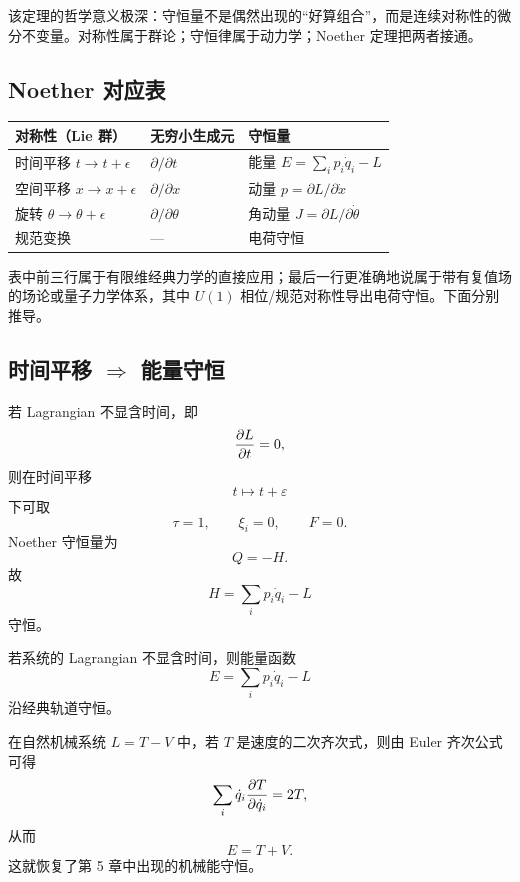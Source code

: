 \begin{remark}
该定理的哲学意义极深：守恒量不是偶然出现的“好算组合”，而是连续对称性的微分不变量。对称性属于群论；守恒律属于动力学；Noether 定理把两者接通。
\end{remark}

\subsection{Noether 对应表}

\begin{center}
\renewcommand{\arraystretch}{1.35}
\begin{tabularx}{0.94\textwidth}{>{\raggedright\arraybackslash}p{} >{\centering\arraybackslash}p{} >{\raggedright\arraybackslash}X}
\toprule
对称性（Lie 群） & 无穷小生成元 & 守恒量 \\
\midrule
时间平移 $t\to t+\epsilon$ & $\partial/\partial t$ & 能量 $E=\sum_i p_i\dot q_i-L$ \\
空间平移 $x\to x+\epsilon$ & $\partial/\partial x$ & 动量 $p=\partial L/\partial \dot x$ \\
旋转 $\theta\to \theta+\epsilon$ & $\partial/\partial \theta$ & 角动量 $J=\partial L/\partial \dot\theta$ \\
规范变换 & --- & 电荷守恒 \\
\bottomrule
\end{tabularx}
\end{center}

表中前三行属于有限维经典力学的直接应用；最后一行更准确地说属于带有复值场的场论或量子力学体系，其中 $U(1)$ 相位/规范对称性导出电荷守恒。下面分别推导。

\subsection{时间平移 $\Rightarrow$ 能量守恒}

若 Lagrangian 不显含时间，即
\[
  \pdv{L}{t}=0,
\]
则在时间平移
\[
  t\mapsto t+\varepsilon
\]
下可取
\[
  \tau=1,
  \qquad
  \xi_i=0,
  \qquad
  F=0.
\]
Noether 守恒量为
\[
  Q=-H.
\]
故
\[
  H=\sum_i p_i\dot q_i-L
\]
守恒。

\begin{law}
若系统的 Lagrangian 不显含时间，则能量函数
\[
  E=\sum_i p_i\dot q_i-L
\]
沿经典轨道守恒。
\end{law}

在自然机械系统 $L=T-V$ 中，若 $T$ 是速度的二次齐次式，则由 Euler 齐次公式可得
\[
  \sum_i \dot q_i\pdv{T}{\dot q_i}=2T,
\]
从而
\[
  E=T+V.
\]
这就恢复了第 5 章中出现的机械能守恒。

